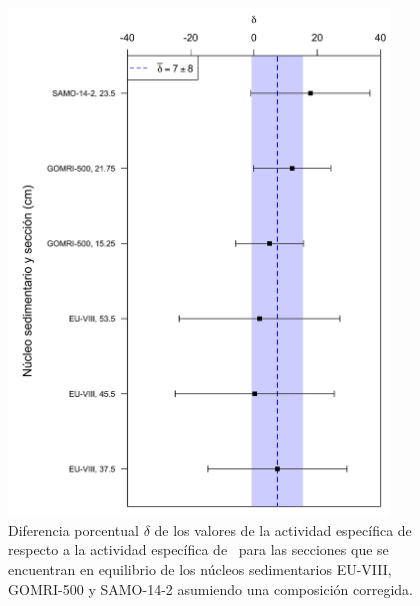 \begin{figure}
\centering
\includegraphics[width=0.9\textwidth]{Imagenes/Grafica_Delta_210Pb_214Pb-2.png}
\caption{Diferencia porcentual $\delta$ de los valores de la actividad específica de \PbCero\, respecto a la actividad específica de \PbCuatro\, para las secciones que se encuentran en equilibrio de los núcleos sedimentarios EU-VIII, GOMRI-500 y SAMO-14-2 asumiendo una composición corregida.}\label{Fig-DiffPorcentualEquilibrio}
\end{figure}
\newpage
